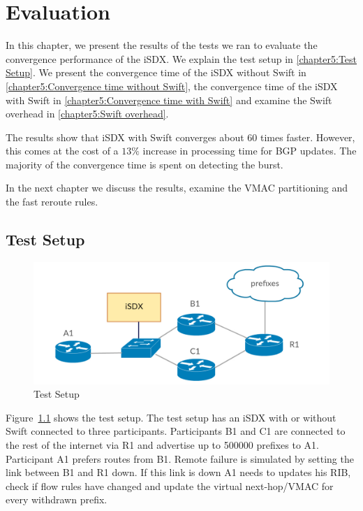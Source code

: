 \chapter{\label{chapter5}Evaluation}

In this chapter, we present the results of the tests we ran to evaluate the convergence performance of the iSDX. We explain the test setup in \ref{chapter5:Test Setup}. We present the convergence time of the iSDX without Swift in \ref{chapter5:Convergence time without Swift}, the convergence time of the iSDX with Swift in \ref{chapter5:Convergence time with Swift} and examine the Swift overhead in \ref{chapter5:Swift overhead}.

The results show that iSDX with Swift converges about 60 times faster. However, this comes at the cost of a $13\%$ increase in processing time for BGP updates. The majority of the convergence time is spent on detecting the burst.

In the next chapter we discuss the results, examine the VMAC partitioning and the fast reroute rules.

\section{\label{chapter5:Test Setup}Test Setup}

\begin{figure}[h]
\center
\includegraphics[scale = 0.36]{Figures/eval_exp_setup.pdf}
\caption{Test Setup}
\label{fig:test-setup}
\end{figure}

Figure~\ref{fig:test-setup} shows the test setup.
The test setup has an iSDX with or without Swift connected to three participants. Participants B1 and C1 are connected to the rest of the internet via R1 and advertise up to 500000 prefixes to A1. Participant A1 prefers routes from B1. Remote failure is simulated by setting the link between B1 and R1 down. If this link is down A1 needs to updates his RIB, check if flow rules have changed and update the virtual next-hop/VMAC for every withdrawn prefix.

